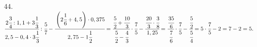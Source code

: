 44. $\cfrac{2\cfrac{3}{4}:1,1+3\cfrac{1}{3}}{2,5-0,4\cdot3\cfrac{1}{3}}:\cfrac{5}{7}-
\cfrac{\left(2\cfrac{1}{6}+4,5\right)\cdot0,375}{2,75-1\cfrac{1}{2}}=
\cfrac{\cfrac{5}{2}+\cfrac{10}{3}}{\cfrac{5}{2}-\cfrac{4}{3}}\cdot\cfrac{7}{5}-
\cfrac{\cfrac{20}{3}\cdot\cfrac{3}{8}}{1,25}=\cfrac{\cfrac{35}{6}}{\cfrac{7}{6}}\cdot\cfrac{7}{5}-
\cfrac{\cfrac{5}{2}}{\cfrac{5}{4}}=5\cdot\cfrac{7}{5}-2=7-2=5.$\\
